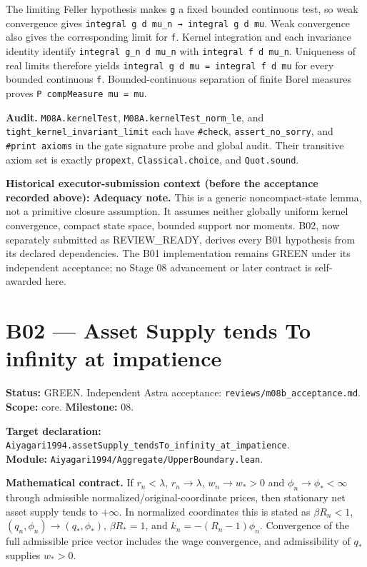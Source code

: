 \documentclass[
  11pt,
]{article}
\let\LedgerOriginalTexttt\texttt
\renewcommand{\texttt}[1]{{\small\LedgerOriginalTexttt{#1}}}
\begin{document}
The limiting Feller hypothesis makes \texttt{g} a fixed bounded
continuous test, so weak convergence gives
\texttt{integral\ g\ d\ mu\_n\ →\ integral\ g\ d\ mu}. Weak convergence
also gives the corresponding limit for \texttt{f}. Kernel integration
and each invariance identity identify \texttt{integral\ g\_n\ d\ mu\_n}
with \texttt{integral\ f\ d\ mu\_n}. Uniqueness of real limits therefore
yields \texttt{integral\ g\ d\ mu\ =\ integral\ f\ d\ mu} for every
bounded continuous \texttt{f}. Bounded-continuous separation of finite
Borel measures proves \texttt{P\ compMeasure\ mu\ =\ mu}.

\textbf{Audit.} \texttt{M08A.kernelTest},
\texttt{M08A.kernelTest\_norm\_le}, and
\texttt{tight\_kernel\_invariant\_limit} each have \texttt{\#check},
\texttt{assert\_no\_sorry}, and \texttt{\#print\ axioms} in the gate
signature probe and global audit. Their transitive axiom set is exactly
\texttt{propext}, \texttt{Classical.choice}, and \texttt{Quot.sound}.

\textbf{Historical executor-submission context (before the acceptance
recorded above):} \textbf{Adequacy note.} This is a generic
noncompact-state lemma, not a primitive closure assumption. It assumes
neither globally uniform kernel convergence, compact state space,
bounded support nor moments. B02, now separately submitted as
REVIEW\_READY, derives every B01 hypothesis from its declared
dependencies. The B01 implementation remains GREEN under its independent
acceptance; no Stage 08 advancement or later contract is self-awarded
here.

\section{B02 --- Asset Supply tends To infinity at
impatience}\label{b02-asset-supply-tends-to-infinity-at-impatience}

\textbf{Status:} GREEN. Independent Astra acceptance:
\texttt{reviews/m08b\_acceptance.md}. \textbf{Scope:} core.
\textbf{Milestone:} 08.

\textbf{Target declaration:}
\texttt{Aiyagari1994.assetSupply\_tendsTo\_infinity\_at\_impatience}.\\
\textbf{Module:} \texttt{Aiyagari1994/Aggregate/UpperBoundary.lean}.

\textbf{Mathematical contract.} If \(r_n<\lambda\), \(r_n\to\lambda\),
\(w_n\to w_*>0\) and \(\phi_n\to\phi_*<\infty\) through admissible
normalized/original-coordinate prices, then stationary net asset supply
tends to \(+\infty\). In normalized coordinates this is stated as
\(\beta R_n<1\), \((q_n,\phi_n)\to(q_*,\phi_*)\), \(\beta R_*=1\), and
\(k_n=-(R_n-1)\phi_n\). Convergence of the full admissible price vector
includes the wage convergence, and admissibility of \(q_*\) supplies
\(w_*>0\).
\end{document}
